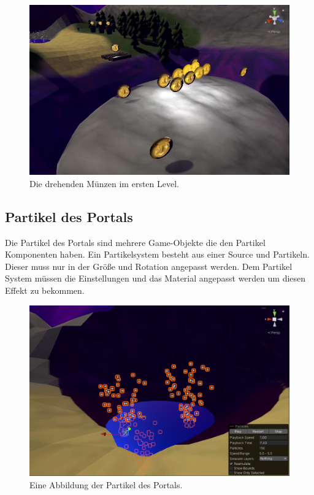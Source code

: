 \begin{figure}[H]
  \centering
  \includegraphics[width=0.5\linewidth]{chapters/14/Images/Animation.png}
  \caption{Die drehenden Münzen im ersten Level.}
  \label{U06}
\end{figure}

\subsection{Partikel des Portals}

Die Partikel des Portals sind mehrere Game-Objekte die den Partikel Komponenten haben. Ein Partikelsystem besteht aus einer Source und Partikeln. Dieser muss nur in der Größe und Rotation angepasst werden. Dem Partikel System müssen die Einstellungen und das Material angepasst werden um diesen Effekt zu bekommen.

\begin{figure}[H]
  \centering
  \includegraphics[width=0.5\linewidth]{chapters/14/Images/Partikel.png}
  \caption{Eine Abbildung der Partikel des Portals.}
  \label{U07}
\end{figure}